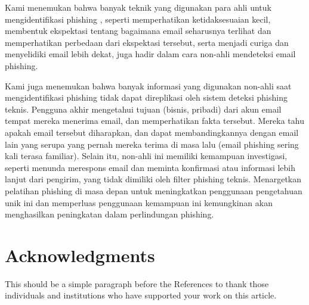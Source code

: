 \documentclass[lettersize,journal]{IEEEtran}
\begin{document}
Kami menemukan bahwa banyak teknik yang digunakan para ahli untuk
mengidentifikasi phishing \cite{tigaempat}, seperti memperhatikan
ketidaksesuaian kecil, membentuk ekspektasi tentang bagaimana email seharusnya
terlihat dan memperhatikan perbedaan dari ekspektasi tersebut, serta menjadi
curiga dan menyelidiki email lebih dekat, juga hadir dalam cara non-ahli
mendeteksi email phishing.

Kami juga menemukan bahwa banyak informasi yang digunakan non-ahli saat
mengidentifikasi phishing tidak dapat direplikasi oleh sistem deteksi phishing
teknis. Pengguna akhir mengetahui tujuan (bisnis, pribadi) dari akun email
tempat mereka menerima email, dan memperhatikan fakta tersebut. Mereka tahu
apakah email tersebut diharapkan, dan dapat membandingkannya dengan email lain
yang serupa yang pernah mereka terima di masa lalu (email phishing sering kali
terasa familiar). Selain itu, non-ahli ini memiliki kemampuan investigasi,
seperti menunda merespons email dan meminta konfirmasi atau informasi lebih
lanjut dari pengirim, yang tidak dimiliki oleh filter phishing teknis.
Menargetkan pelatihan phishing di masa depan untuk meningkatkan penggunaan
pengetahuan unik ini dan memperluas penggunaan kemampuan ini kemungkinan akan
menghasilkan peningkatan dalam perlindungan phishing.

\section*{Acknowledgments}
This should be a simple paragraph before the References to thank those individuals and institutions who have supported your work on this article.
\end{document}
